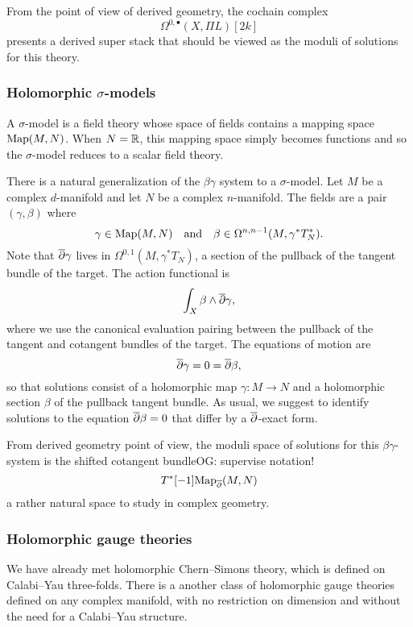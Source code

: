 \documentclass[11pt]{amsart}
\def\owen#1{{\textcolor{violet!50!black}{OG: {#1}}}}
\begin{document}
From the point of view of derived geometry, the cochain complex
\[
\Omega^{0,\bullet}(X, \Pi L)[2k]
\]
presents a derived super stack that should be viewed as the moduli of solutions for this theory.

\subsubsection{Holomorphic $\sigma$-models}

A $\sigma$-model is a field theory whose space of fields contains a mapping space ${\rm Map}(M,N)$.
When $N = \mathbb R$, this mapping space simply becomes functions and so the $\sigma$-model reduces to a scalar field theory.

There is a natural generalization of the $\beta\gamma$ system to a $\sigma$-model.
Let $M$ be a complex $d$-manifold and let $N$ be a complex $n$-manifold.
The fields are a pair $(\gamma, \beta)$ where
\[
\gamma \in {\rm Map}(M,N) \quad\text{and}\quad \beta \in \Omega^{n,n-1}(M,\gamma^* T^*_N) .
\]
Note that ${\overline{\partial}} \gamma$ lives in $\Omega^{0,1}(M, \gamma^* T_N)$, 
a section of the pullback of the tangent bundle of the target.
The action functional is 
\[
\int_X \beta \wedge {\overline{\partial}} \gamma,
\]
where we use the canonical evaluation pairing between the pullback of the tangent and cotangent bundles of the target.
The equations of motion are
\[
{\overline{\partial}} \gamma = 0 = {\overline{\partial}} \beta,
\]
so that solutions consist of a holomorphic map $\gamma: M \to N$ and a holomorphic section $\beta$ of the pullback tangent bundle.
As usual, we suggest to identify solutions to the equation ${\overline{\partial}} \beta = 0$ that differ by a ${\overline{\partial}}$-exact form.

From derived geometry point of view, the moduli space of solutions for this $\beta\gamma$-system is the shifted cotangent bundle\owen{supervise notation!}
\[
T^*[-1] {\rm Map}_{\overline{\partial}}(M,N) 
\]
a rather natural space to study in complex geometry.

\subsubsection{Holomorphic gauge theories}
\label{sec: hol BF dfn}

We have already met holomorphic Chern--Simons theory, which is defined on Calabi--Yau three-folds.
There is a another class of holomorphic gauge theories 
defined on any complex manifold, with no restriction on dimension 
and without the need for a Calabi--Yau structure. 
\end{document}
